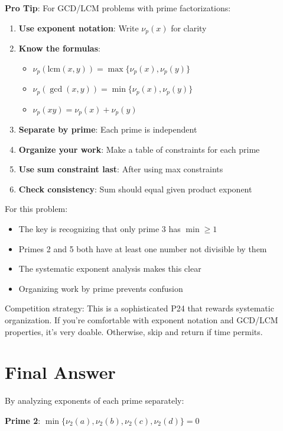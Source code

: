 \documentclass[12pt]{article}
\begin{document}
\begin{tipbox}
\textbf{Pro Tip}: For GCD/LCM problems with prime factorizations:

\begin{enumerate}
    \item \textbf{Use exponent notation}: Write $\nu_p(x)$ for clarity
    \item \textbf{Know the formulas}:
    \begin{itemize}
        \item $\nu_p(\text{lcm}(x,y)) = \max\{\nu_p(x), \nu_p(y)\}$
        \item $\nu_p(\gcd(x,y)) = \min\{\nu_p(x), \nu_p(y)\}$
        \item $\nu_p(xy) = \nu_p(x) + \nu_p(y)$
    \end{itemize}
    \item \textbf{Separate by prime}: Each prime is independent
    \item \textbf{Organize your work}: Make a table of constraints for each prime
    \item \textbf{Use sum constraint last}: After using max constraints
    \item \textbf{Check consistency}: Sum should equal given product exponent
\end{enumerate}

For this problem:
\begin{itemize}
    \item The key is recognizing that only prime 3 has $\min \geq 1$
    \item Primes 2 and 5 both have at least one number not divisible by them
    \item The systematic exponent analysis makes this clear
    \item Organizing work by prime prevents confusion
\end{itemize}

Competition strategy: This is a sophisticated P24 that rewards systematic organization. If you're comfortable with exponent notation and GCD/LCM properties, it's very doable. Otherwise, skip and return if time permits.
\end{tipbox}

\section*{Final Answer}

By analyzing exponents of each prime separately:

\textbf{Prime 2}: $\min\{\nu_2(a), \nu_2(b), \nu_2(c), \nu_2(d)\} = 0$
\end{document}
